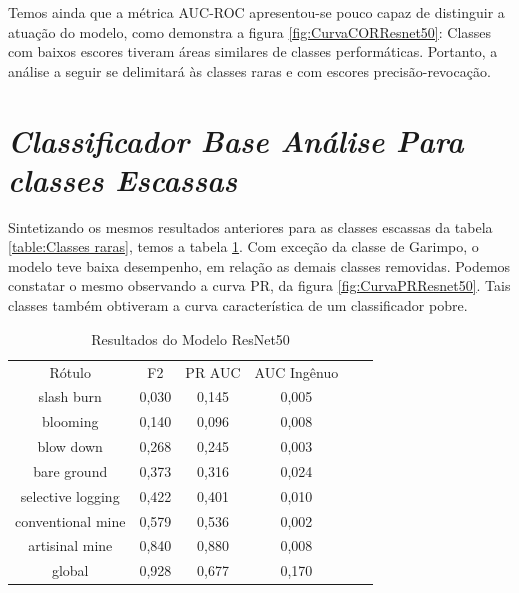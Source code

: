 Temos ainda que a métrica AUC-ROC apresentou-se pouco capaz de distinguir a atuação do modelo, como demonstra a figura \ref{fig:CurvaCORResnet50}: Classes com baixos escores tiveram áreas similares de classes performáticas. Portanto, a análise a seguir se delimitará às classes raras e com escores precisão-revocação.

\section{\textit{Classificador Base Análise Para classes Escassas}}\label{sec:Cap4_ClassifiadorBase}

Sintetizando os mesmos resultados anteriores para as classes escassas da tabela \ref{table:Classes raras}, temos a tabela \ref{table:ResultadosResnet50ClassesRaras}. Com exceção da classe de Garimpo, o modelo teve baixa desempenho, em relação as demais classes removidas. Podemos constatar o mesmo observando a curva PR, da figura \ref{fig:CurvaPRResnet50}. Tais classes também obtiveram a curva característica de um classificador pobre. 



\begin{table}[h!]
    \caption{Resultados do Modelo ResNet50}
    \centering
\begin{tabular}{*{6}{c}}
    \toprule
    \midrule
                 Rótulo &  F2    & PR AUC &  AUC Ingênuo \\
             slash burn &  0,030 &  0,145 &       0,005 \\
               blooming &  0,140 &  0,096 &       0,008 \\
              blow down &  0,268 &  0,245 &       0,003 \\
            bare ground &  0,373 &  0,316 &       0,024 \\
      selective logging &  0,422 &  0,401 &       0,010 \\
      conventional mine &  0,579 &  0,536 &       0,002 \\
         artisinal mine &  0,840 &  0,880 &       0,008 \\
                 global &  0,928 &  0,677 &       0,170 \\         
    \bottomrule
\end{tabular}
\label{table:ResultadosResnet50ClassesRaras}
\end{table}
  

